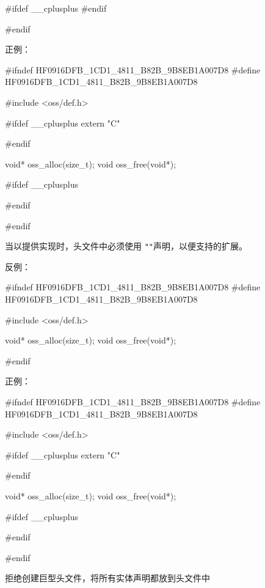 \begin{content}
\begin{leftbar}
\begin{c++}[caption={\ttfamily{oss/oss\_memery.h}}]
{#ifdef  __cplusplus
}
#endif

#endif
\end{c++}
\end{leftbar}

正例：
\begin{leftbar}
\begin{c++}[caption={\ttfamily{oss/oss\_memery.h}}]
#ifndef HF0916DFB_1CD1_4811_B82B_9B8EB1A007D8
#define HF0916DFB_1CD1_4811_B82B_9B8EB1A007D8
    
#include <oss/def.h>

#ifdef  __cplusplus
extern "C" {
#endif

void* oss_alloc(size_t);
void  oss_free(void*);

#ifdef  __cplusplus
}
#endif

#endif
\end{c++}
\end{leftbar}

\begin{regulation}
当以提供实现时，头文件中必须使用
\texttt{"}\texttt{"}声明，以便支持的扩展。
\end{regulation}

反例：
\begin{leftbar}
\begin{c++}[caption={oss/oss\_memery.h}]
#ifndef HF0916DFB_1CD1_4811_B82B_9B8EB1A007D8
#define HF0916DFB_1CD1_4811_B82B_9B8EB1A007D8    

#include <oss/def.h>

void* oss_alloc(size_t);
void  oss_free(void*);

#endif
\end{c++}
\end{leftbar}

正例：
\begin{leftbar}
\begin{c++}[caption={oss/oss\_memery.h}]
#ifndef HF0916DFB_1CD1_4811_B82B_9B8EB1A007D8
#define HF0916DFB_1CD1_4811_B82B_9B8EB1A007D8    

#include <oss/def.h>

#ifdef  __cplusplus
extern "C" {
#endif

void* oss_alloc(size_t);
void  oss_free(void*);

#ifdef  __cplusplus
}
#endif

#endif
\end{c++}
\end{leftbar}

\begin{advise}
拒绝创建巨型头文件，将所有实体声明都放到头文件中
\end{advise}


\end{content}
